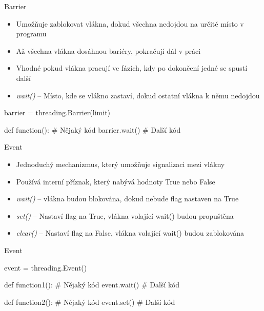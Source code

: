 \documentclass{beamer}
\begin{document}
\begin{frame}[fragile]{Barrier}
    \begin{itemize}
        \item Umožňuje zablokovat vlákna, dokud všechna nedojdou na určité místo v programu
        \item Až všechna vlákna dosáhnou bariéry, pokračují dál v práci
        \item Vhodné pokud vlákna pracují ve fázích, kdy po dokončení jedné se spustí další

        \vskip 0.25in
        \item \textit{wait()} – Místo, kde se vlákno zastaví, dokud ostatní vlákna k němu nedojdou
    \end{itemize}
    \scriptsize
    \begin{semiverbatim}
    barrier = threading.Barrier(limit)

    def function():
        # Nějaký kód
        barrier.wait()
        # Další kód
    \end{semiverbatim}
\end{frame}

\begin{frame}{Event}
    \begin{itemize}
        \item Jednoduchý mechanizmus, který umožňuje signalizaci mezi vlákny
        \item Používá interní příznak, který nabývá hodnoty True nebo False
        \vskip 0.25in

        \item \textit{wait()} – vlákna budou blokována, dokud nebude flag nastaven na True
        \item \textit{set()} – Nastaví flag na True, vlákna volající wait() budou propuštěna
        \item \textit{clear()} – Nastaví flag na False, vlákna volající wait() budou zablokována
    \end{itemize}
\end{frame}

\begin{frame}[fragile]{Event}
    \begin{semiverbatim}
    event = threading.Event()

    def function1():
    	# Nějaký kód
    	event.wait()
    	# Další kód
    
    def function2():
    	# Nějaký kód
    	event.set()
    	# Další kód  
    \end{semiverbatim}
\end{frame}
\end{document}
